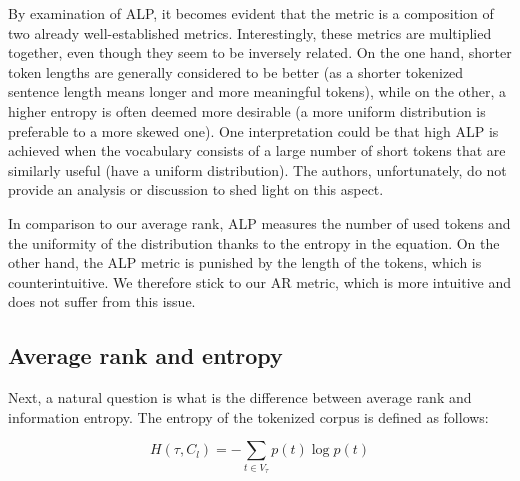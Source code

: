 
By examination of ALP, it becomes evident that the metric is a composition of two already well-established metrics. Interestingly, these metrics are multiplied together, even though they seem to be inversely related. On the one hand, shorter token lengths are generally considered to be better (as a shorter tokenized sentence length means longer and more meaningful tokens), while on the other, a higher entropy is often deemed more desirable (a more uniform distribution is preferable to a more skewed one). One interpretation could be that high ALP is achieved when the vocabulary consists of a large number of short tokens that are similarly useful (have a uniform distribution). The authors, unfortunately, do not provide an analysis or discussion to shed light on this aspect.

In comparison to our average rank, ALP measures the number of used tokens and the uniformity of the distribution thanks to the entropy in the equation. On the other hand, the ALP metric is punished by the length of the tokens, which is counterintuitive. We therefore stick to our AR metric, which is more intuitive and does not suffer from this issue.

\subsection{Average rank and entropy}

Next, a natural question is what is the difference between average rank and information entropy. The entropy of the tokenized corpus is defined as follows:

\begin{equation}
    H(\tau, C_l) = - \sum_{t \in V_\tau} p(t) \log p(t)
\end{equation}

